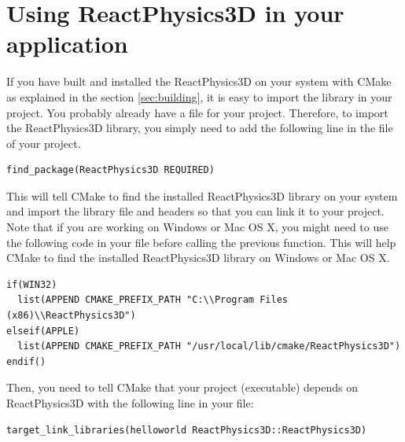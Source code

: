 \documentclass[a4paper,12pt]{article}
\begin{document}
    \section{Using ReactPhysics3D in your application}

    If you have built and installed the ReactPhysics3D on your system with CMake as explained in the section \ref{sec:building}, it is easy to import the
    library in your project. You probably already have a  file for your project. Therefore, to import the ReactPhysics3D
    library, you simply need to add the following line in the  file of your project.

    \lstset{style=customcmake}

    \vspace{0.6cm}

    \begin{lstlisting}
find_package(ReactPhysics3D REQUIRED)
    \end{lstlisting}

    \vspace{0.6cm}

    This will tell CMake to find the installed ReactPhysics3D library on your system and import the library file and headers so that you can
    link it to your project. Note that if you are working on Windows or Mac OS X, you might need to use the following code in your  file
    before calling the previous function. This will help CMake to find the installed ReactPhysics3D library on Windows or Mac OS X. 

    \vspace{0.6cm}

    \begin{lstlisting}
if(WIN32)
  list(APPEND CMAKE_PREFIX_PATH "C:\\Program Files (x86)\\ReactPhysics3D")
elseif(APPLE)
  list(APPEND CMAKE_PREFIX_PATH "/usr/local/lib/cmake/ReactPhysics3D")
endif()
    \end{lstlisting}

    \vspace{0.6cm}

    Then, you need to tell CMake that your project (executable) depends on ReactPhysics3D with the following line in your  file: 

    \vspace{0.6cm}

    \begin{lstlisting}
target_link_libraries(helloworld ReactPhysics3D::ReactPhysics3D)
    \end{lstlisting}
\end{document}
